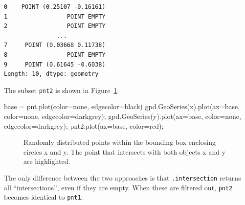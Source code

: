 \documentclass[
  letterpaper,
]{krantz}
\newenvironment{Shaded}{\begin{snugshade}}{\end{snugshade}}
\newcommand{\NormalTok}[1]{\textcolor[rgb]{0.00,0.23,0.31}{#1}}
\newcommand{\OperatorTok}[1]{\textcolor[rgb]{0.37,0.37,0.37}{#1}}
\newcommand{\StringTok}[1]{\textcolor[rgb]{0.13,0.47,0.30}{#1}}
\begin{document}
\begin{verbatim}
0    POINT (0.25107 -0.16161)
1                 POINT EMPTY
2                 POINT EMPTY
               ...           
7     POINT (0.03668 0.11738)
8                 POINT EMPTY
9     POINT (0.61645 -0.6038)
Length: 10, dtype: geometry
\end{verbatim}

The subset \texttt{pnt2} is shown in
Figure~\ref{fig-intersection-points}.

\begin{Shaded}
\begin{Highlighting}[]
\NormalTok{base }\OperatorTok{=}\NormalTok{ pnt.plot(color}\OperatorTok{=}\StringTok{\textquotesingle{}none\textquotesingle{}}\NormalTok{, edgecolor}\OperatorTok{=}\StringTok{\textquotesingle{}black\textquotesingle{}}\NormalTok{)}
\NormalTok{gpd.GeoSeries(x).plot(ax}\OperatorTok{=}\NormalTok{base, color}\OperatorTok{=}\StringTok{\textquotesingle{}none\textquotesingle{}}\NormalTok{, edgecolor}\OperatorTok{=}\StringTok{\textquotesingle{}darkgrey\textquotesingle{}}\NormalTok{)}\OperatorTok{;}
\NormalTok{gpd.GeoSeries(y).plot(ax}\OperatorTok{=}\NormalTok{base, color}\OperatorTok{=}\StringTok{\textquotesingle{}none\textquotesingle{}}\NormalTok{, edgecolor}\OperatorTok{=}\StringTok{\textquotesingle{}darkgrey\textquotesingle{}}\NormalTok{)}\OperatorTok{;}
\NormalTok{pnt2.plot(ax}\OperatorTok{=}\NormalTok{base, color}\OperatorTok{=}\StringTok{\textquotesingle{}red\textquotesingle{}}\NormalTok{)}\OperatorTok{;}
\end{Highlighting}
\end{Shaded}

\begin{figure}[H]


\caption{\label{fig-intersection-points}Randomly distributed points
within the bounding box enclosing circles x and y. The point that
intersects with both objects x and y are highlighted.}

\end{figure}%

The only difference between the two approaches is that
\texttt{.intersection} returns all ``intersections'', even if they are
empty. When these are filtered out, \texttt{pnt2} becomes identical to
\texttt{pnt1}:
\end{document}
